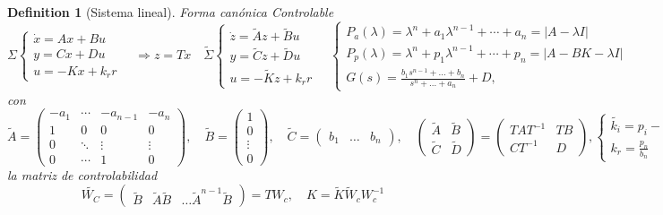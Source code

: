 \documentclass[leqno]{article}
\newtheorem*{definition}{Definition}
\begin{document}
\begin{definition}[Sistema lineal] Forma canónica Controlable
\[
\Sigma  \begin{cases}
  \dot{x}=Ax + Bu \\ 
  y = Cx + Du\\
  u = -Kx+k_rr
\end{cases}
\quad \Rightarrow z=Tx \quad 
\tilde{\Sigma }  \begin{cases}
  \dot{z} = \tilde{A}z + \tilde{B}u \\
  y = \tilde{C} z + \tilde{D}u\\
  u = -\tilde{K}z + k_rr
\end{cases}
\quad \begin{cases}
 P_a(\lambda) = \lambda^n +  a_1 \lambda^{n-1} + \cdots + a_n = |A-\lambda I|\\
 P_{p}(\lambda) = \lambda^n + p_1\lambda^{n-1} + \cdots +  p_n = |A-BK-\lambda I|\\
 G(s) = \frac{b_1s ^{n-1}+ \ldots + b_n}{ s^n + \ldots+ a_n} + D,
\end{cases}
\] 
con 
\[
  \tilde{A} = \begin{pmatrix} -a_1 & \cdots & -a_{n-1} & -a_n \\ 1 & 0 & 0 & 0 \\ 0 & \ddots & \vdots & \vdots \\ 0 & \cdots & 1 & 0  \end{pmatrix}, \quad \tilde{B} = \begin{pmatrix} 1\\ 0 \\ \vdots \\0 \end{pmatrix}, \quad \tilde{C} = \begin{pmatrix} b_1 & \ldots & b_n \end{pmatrix}, \quad \begin{pmatrix} \tilde{A} & \tilde{B} \\ \tilde{C} & \tilde{D} \end{pmatrix}  = \begin{pmatrix} TAT^{-1} & TB \\ CT^{-1} & D \end{pmatrix}, \begin{cases}
\tilde{k_i} = p_i-a_i \\ k_r = \frac{p_n}{b_n} \end{cases}
\] 
la matriz de controlabilidad
\[
  \tilde{W_C} = \begin{pmatrix} \tilde{B} & \tilde{A}\tilde{B} & \ldots \tilde{A}^{n-1}\tilde{B} \end{pmatrix} = TW_c, \quad  K = \tilde{K} \tilde{W}_cW_c^{-1}
\] 
\end{definition}
\end{document}
